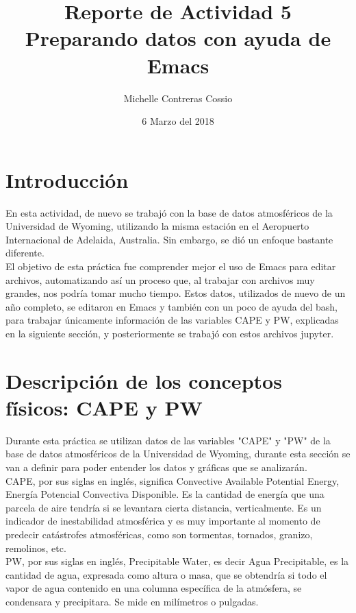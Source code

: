 \documentclass[a4paper]{article}
\title{Reporte de Actividad 5\\Preparando datos con ayuda de Emacs}
\author{Michelle Contreras Cossio}
\date{6 Marzo del 2018}
\begin{document}
\maketitle

\section{Introducción}

En esta actividad, de nuevo se trabajó con la base de datos atmosféricos de la Universidad de Wyoming, utilizando la misma estación en el Aeropuerto Internacional de Adelaida, Australia. Sin embargo, se dió un enfoque bastante diferente. \\

El objetivo de esta práctica fue comprender mejor el uso de Emacs para editar archivos, automatizando así un proceso que, al trabajar con archivos muy grandes, nos podría tomar mucho tiempo. Estos datos, utilizados de nuevo de un año completo, se editaron en Emacs y también con un poco de ayuda del bash, para trabajar únicamente información de las variables CAPE y PW, explicadas en la siguiente sección, y posteriormente se trabajó con estos archivos jupyter. 

\section{Descripción de los conceptos físicos: CAPE y PW}

Durante esta práctica se utilizan datos de las variables "CAPE" y "PW" de la base de datos atmosféricos de la Universidad de Wyoming, durante esta sección se van a definir para poder entender los datos y gráficas que se analizarán.\\

CAPE, por sus siglas en inglés, significa Convective Available Potential Energy, Energía Potencial Convectiva Disponible. Es la cantidad de energía que una parcela de aire tendría si se levantara cierta distancia, verticalmente. Es un indicador de inestabilidad atmosférica y es muy importante al momento de predecir catástrofes atmosféricas, como son tormentas, tornados, granizo, remolinos, etc.\\

PW, por sus siglas en inglés, Precipitable Water, es decir Agua Precipitable, es la cantidad de agua, expresada como altura o masa, que se obtendría si todo el vapor de agua contenido en una columna específica de la atmósfera, se condensara y precipitara. Se mide en milímetros o pulgadas. 
\end{document}

